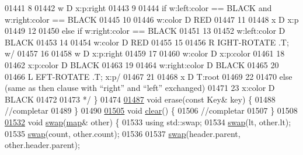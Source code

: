 \begin{DoxyCode}
01441 \textcolor{comment}{8}
01442 \textcolor{comment}{w D x:p:right}
01443 \textcolor{comment}{9}
01444 \textcolor{comment}{if w:left:color == BLACK and w:right:color == BLACK}
01445 \textcolor{comment}{10}
01446 \textcolor{comment}{w:color D RED}
01447 \textcolor{comment}{11}
01448 \textcolor{comment}{x D x:p}
01449 \textcolor{comment}{12}
01450 \textcolor{comment}{else if w:right:color == BLACK}
01451 \textcolor{comment}{13}
01452 \textcolor{comment}{w:left:color D BLACK}
01453 \textcolor{comment}{14}
01454 \textcolor{comment}{w:color D RED}
01455 \textcolor{comment}{15}
01456 \textcolor{comment}{R IGHT-ROTATE .T; w/}
01457 \textcolor{comment}{16}
01458 \textcolor{comment}{w D x:p:right}
01459 \textcolor{comment}{17}
01460 \textcolor{comment}{w:color D x:p:color}
01461 \textcolor{comment}{18}
01462 \textcolor{comment}{x:p:color D BLACK}
01463 \textcolor{comment}{19}
01464 \textcolor{comment}{w:right:color D BLACK}
01465 \textcolor{comment}{20}
01466 \textcolor{comment}{L EFT-ROTATE .T; x:p/}
01467 \textcolor{comment}{21}
01468 \textcolor{comment}{x D T:root}
01469 \textcolor{comment}{22}
01470 \textcolor{comment}{else (same as then clause with “right” and “left” exchanged)}
01471 \textcolor{comment}{23 x:color D BLACK}
01472 \textcolor{comment}{}
01473 \textcolor{comment}{   */} \}
01474 
\hyperlink{namespaceaed2_af94e184e6463abb6f7f5237afd0d808a_af94e184e6463abb6f7f5237afd0d808a}{01487}     \textcolor{keywordtype}{void} erase(\textcolor{keyword}{const} Key& key) \{
01488         \textcolor{comment}{//completar}
01489     \}
01490 
\hyperlink{namespaceaed2_ac055546b287d4b50772e8b4e9d188ed2_ac055546b287d4b50772e8b4e9d188ed2}{01505}     \textcolor{keywordtype}{void} \hyperlink{namespaceaed2_ac055546b287d4b50772e8b4e9d188ed2_ac055546b287d4b50772e8b4e9d188ed2}{clear}() \{
01506         \textcolor{comment}{//completar}
01507     \}
01508 
\hyperlink{namespaceaed2_ab24ac4be44835194ce27a61969e4a292_ab24ac4be44835194ce27a61969e4a292}{01532}     \textcolor{keywordtype}{void} \hyperlink{namespaceaed2_ab24ac4be44835194ce27a61969e4a292_ab24ac4be44835194ce27a61969e4a292}{swap}(\hyperlink{classaed2_1_1map}{map}& other) \{
01533         \textcolor{keyword}{using} std::swap;
01534         \hyperlink{namespaceaed2_ab24ac4be44835194ce27a61969e4a292_ab24ac4be44835194ce27a61969e4a292}{swap}(lt, other.lt);
01535         \hyperlink{namespaceaed2_ab24ac4be44835194ce27a61969e4a292_ab24ac4be44835194ce27a61969e4a292}{swap}(count, other.count);
01536 
01537         \hyperlink{namespaceaed2_ab24ac4be44835194ce27a61969e4a292_ab24ac4be44835194ce27a61969e4a292}{swap}(header.parent, other.header.parent);

\end{DoxyCode}
